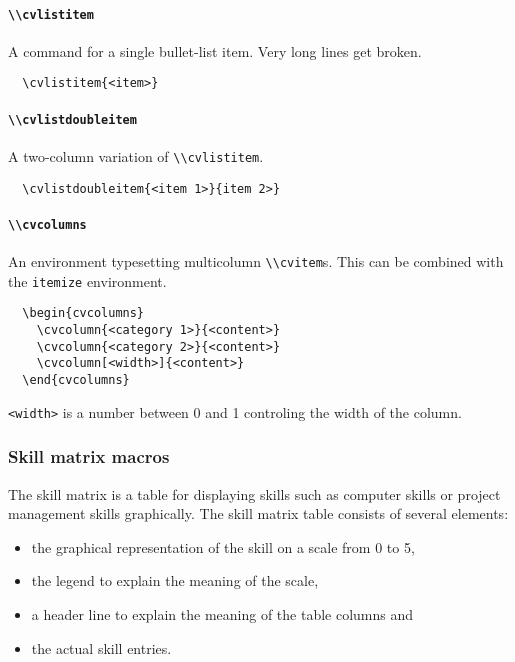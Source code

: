 \documentclass[a4paper, 11pt]{article}
\newcommand{\code}[1]{\lstinline!#1!}
\begin{document}
\paragraph{\code{\\cvlistitem}}
A command for a single bullet-list item.
Very long lines get broken.
\begin{lstlisting}
  \cvlistitem{<item>}
\end{lstlisting}

\paragraph{\code{\\cvlistdoubleitem}}
A two-column variation of \code{\\cvlistitem}.
\begin{lstlisting}
  \cvlistdoubleitem{<item 1>}{item 2>}
\end{lstlisting}

\paragraph{\code{\\cvcolumns}}
An environment typesetting multicolumn \code{\\cvitem}s.
This can be combined with the \code{itemize} environment.
\begin{lstlisting}
  \begin{cvcolumns}
    \cvcolumn{<category 1>}{<content>}
    \cvcolumn{<category 2>}{<content>}
    \cvcolumn[<width>]{<content>}
  \end{cvcolumns}
\end{lstlisting}
\code{<width>} is a number between 0 and 1 controling the width of the column.

\subsubsection{Skill matrix macros}
The skill matrix is a table for displaying skills such as computer skills or project management skills graphically.
The skill matrix table consists of several elements:
\begin{itemize}
  \item the graphical representation of the skill on a scale from 0 to 5,
  \item the legend to explain the meaning of the scale,
  \item a header line to explain the meaning of the table columns and
  \item the actual skill entries.
\end{itemize}
\end{document}
